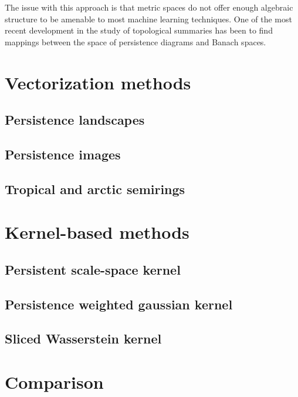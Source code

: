 \documentclass[a4paper,11pt,openany,extrafontsizes]{memoir}
\begin{document}
The issue with this approach is that metric spaces do not offer enough
algebraic structure to be amenable to most machine learning
techniques. One of the most recent development in the study of
topological summaries has been to find mappings between the space of
persistence diagrams and Banach spaces.

\section{Vectorization methods}%
\label{sec:vect-meth}

\subsection{Persistence landscapes}

\subsection{Persistence images}

\subsection{Tropical and arctic semirings}

\section{Kernel-based methods}%
\label{sec:kernel-based-methods}

\subsection{Persistent scale-space kernel}

\subsection{Persistence weighted gaussian kernel}

\subsection{Sliced Wasserstein kernel}

\section{Comparison}%
\label{sec:comparison}




\backmatter%

\printbibliography%
\end{document}

